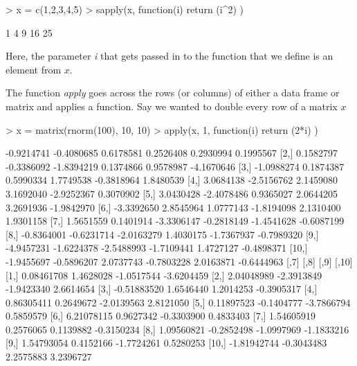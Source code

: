 \documentclass{article}
\begin{document}
\begin{Schunk}
\begin{Sinput}
> x = c(1,2,3,4,5)
> sapply(x, function(i) { return (i^2) } )
\end{Sinput}
\begin{Soutput}
[1]  1  4  9 16 25
\end{Soutput}
\end{Schunk}

Here, the parameter \textit{i} that gets passed in to the function that we
define is an element from $x$.

The function \textit{apply} goes across the rows (or columns) of either a
data frame or matrix and applies a function.  Say we wanted to double
every row of a matrix $x$

\begin{Schunk}
\begin{Sinput}
> x = matrix(rnorm(100), 10, 10)
> apply(x, 1, function(i) { return (2*i) } )
\end{Sinput}
\begin{Soutput}
            [,1]       [,2]       [,3]       [,4]       [,5]       [,6]
 [1,] -0.9214741 -0.4080685  0.6178581  0.2526408  0.2930994  0.1995567
 [2,]  0.1582797 -0.3386092 -1.8394219  0.1374866  0.9578987 -4.1670646
 [3,] -1.0988274  0.1874387  0.5990334  1.7749538 -0.3818964  1.8480539
 [4,]  3.0684138 -2.5156762  2.1459080  3.1692040 -2.9252367  0.3070902
 [5,]  3.0430428 -2.4078486  0.9365027  2.0644205  3.2691936 -1.9842970
 [6,] -3.3392650  2.8545964  1.0777143 -1.8194098  2.1310400  1.9301158
 [7,]  1.5651559  0.1401914 -3.3306147 -0.2818149 -1.4541628 -0.6087199
 [8,] -0.8364001 -0.6231714 -2.0163279  1.4030175 -1.7367937 -0.7989320
 [9,] -4.9457231 -1.6224378 -2.5488993 -1.7109441  1.4727127 -0.4898371
[10,] -1.9455697 -0.5896207  2.0737743 -0.7803228  2.0163871 -0.6444963
             [,7]       [,8]       [,9]      [,10]
 [1,]  0.08461708  1.4628028 -1.0517544 -3.6204459
 [2,]  2.04048989 -2.3913849 -1.9423340  2.6614654
 [3,] -0.51883520  1.6546440  1.2014253 -0.3905317
 [4,]  0.86305411  0.2649672 -2.0139563  2.8121050
 [5,]  0.11897523 -0.1404777 -3.7866794  0.5859579
 [6,]  6.21078115  0.9627342 -0.3303900  0.4833403
 [7,]  1.54605919  0.2576065  0.1139882 -0.3150234
 [8,]  1.09560821 -0.2852498 -1.0997969 -1.1833216
 [9,]  1.54793054  0.4152166 -1.7724261  0.5280253
[10,] -1.81942744 -0.3043483  2.2575883  3.2396727
\end{Soutput}
\end{Schunk}
\end{document}
